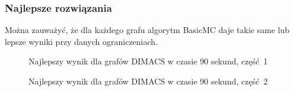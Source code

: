\documentclass[12pt, a4paper]{article}
\begin{document}
\subsubsection{Najlepsze rozwiązania}
Można zauważyć, że dla każdego grafu algorytm BasicMC daje takie same lub lepsze wyniki przy danych ograniczeniach.

\begin{figure}[H]
  \begin{center}
  \end{center}
  \caption{Najlepszy wynik dla grafów DIMACS w czasie 90 sekund, część 1}
  \label{fig:dimacs-best-part1}
\end{figure}

\begin{figure}[H]
  \begin{center}
  \end{center}
  \caption{Najlepszy wynik dla grafów DIMACS w czasie 90 sekund, część 2}
  \label{fig:dimacs-best-part2}
\end{figure}
\end{document}
